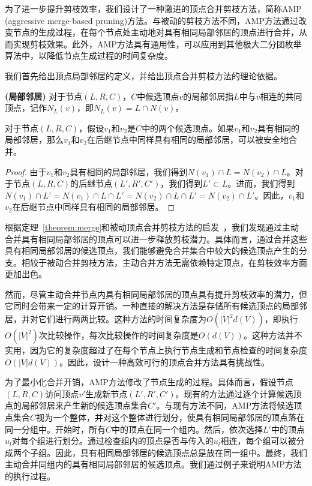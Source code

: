 为了进一步提升剪枝效率，我们设计了一种激进的顶点合并剪枝方法，简称AMP (aggressive merge-based pruning)方法。与被动的剪枝方法不同，AMP方法通过改变节点的生成过程，在每个节点处主动地对具有相同局部邻居的顶点进行合并，从而实现剪枝效果。此外，AMP方法具有通用性，可以应用到其他极大二分团枚举算法中，以降低节点生成过程的时间复杂度。

我们首先给出顶点局部邻居的定义，并给出顶点合并剪枝方法的理论依据。

\begin{definition}
  \textbf{(局部邻居)} 对于节点$(L,R,C)$，$C$中候选顶点$v$的局部邻居指$L$中与$v$相连的共同顶点，记作$N_L(v)$，即$N_L(v) = L \cap N(v)$。
\end{definition}

\begin{theorem}
  对于节点$(L,R,C)$，假设$v_1$和$v_2$是$C$中的两个候选顶点。如果$v_1$和$v_2$具有相同的局部邻居，那么$v_1$和$v_2$在后继节点中同样具有相同的局部邻居，可以被安全地合并。
  \label{theorem:merge}
\end{theorem}

\begin{proof}
  由于$v_1$和$v_2$具有相同的局部邻居，我们得到$N(v_1)\cap L = N(v_2)\cap L$。对于节点$(L,R,C)$的后继节点$(L',R',C')$，我们得到$L' \subset L$。进而，我们得到$N(v_1)\cap L’ = N(v_1) \cap L \cap L' = N(v_2) \cap L \cap L' = N(v_2)\cap L'$。因此，$v_1$和$v_2$在后继节点中同样具有相同的局部邻居。
\end{proof}


根据定理~\ref{theorem:merge}和被动顶点合并剪枝方法的启发~\cite{iMBEA14}，我们发现通过主动合并具有相同局部邻居的顶点可以进一步释放剪枝潜力。具体而言，通过合并这些具有相同局部邻居的候选顶点，我们能够避免合并集合中较大的候选顶点产生的分支。相较于被动合并剪枝方法，主动合并方法无需依赖特定顶点，在剪枝效率方面更加出色。

然而，尽管主动合并节点内具有相同局部邻居的顶点具有提升剪枝效率的潜力，但它同时会带来一定的计算开销。一种直接的解决方法是存储所有候选顶点的局部邻居，并对它们进行两两比较。这种方法的时间复杂度为$O(|V|^2d(V))$，即执行$O(|V|^2)$次比较操作，每次比较操作的时间复杂度是$O(d(V))$。这种方法并不实用，因为它的复杂度超过了在每个节点上执行节点生成和节点检查的时间复杂度$O(|V|d(V))$。因此，设计一种高效可行的顶点合并方法具有挑战性。

为了最小化合并开销，AMP方法修改了节点生成的过程。具体而言，假设节点$(L,R,C)$访问顶点$v'$生成新节点$(L',R',C')$。现有的方法通过逐个计算候选顶点的局部邻居来产生新的候选顶点集合$C'$。与现有方法不同，AMP方法将候选顶点集合$C$视为一个整体，并对这个整体进行划分，使具有相同局部邻居的顶点落在同一分组中。开始时，所有$C$中的顶点在同一个组内。然后，依次选择$L'$中的顶点$u_l$对每个组进行划分。通过检查组内的顶点是否与传入的$u_l$相连，每个组可以被分成两个子组。因此，具有相同局部邻居的候选顶点总是放在同一组中。最终，我们主动合并同组内的具有相同局部邻居的候选顶点。我们通过例子来说明AMP方法的执行过程。


